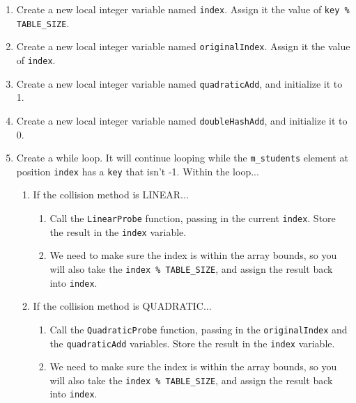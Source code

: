 \documentclass[a4paper,12pt,oneside]{book}
\begin{document}
\begin{enumerate}
    \item   Create a new local integer variable named \texttt{index}.
        Assign it the value of \texttt{key \% TABLE\_SIZE}.
    \item   Create a new local integer variable named \texttt{originalIndex}.
        Assign it the value of \texttt{index}.

    \item   Create a new local integer variable named \texttt{quadraticAdd},
        and initialize it to 1.
    \item   Create a new local integer variable named \texttt{doubleHashAdd},
        and initialize it to 0.

    \item   Create a while loop. It will continue looping while the
        \texttt{m\_students} element at position \texttt{index} has a
        \texttt{key} that isn't -1. Within the loop...
    \begin{enumerate}
        \item   If the collision method is LINEAR...
            \begin{enumerate}
                \item   Call the \texttt{LinearProbe} function,
                    passing in the current \texttt{index}. Store the
                    result in the \texttt{index} variable.
                \item   We need to make sure the index is within the array
                    bounds, so you will also take the \texttt{index \% TABLE\_SIZE},
                    and assign the result back into \texttt{index}.
            \end{enumerate}
            
        \item   If the collision method is QUADRATIC...
            \begin{enumerate}
                \item   Call the \texttt{QuadraticProbe} function,
                    passing in the \texttt{originalIndex} and the
                    \texttt{quadraticAdd} variables. Store the result in the
                    \texttt{index} variable.
                \item   We need to make sure the index is within the array
                    bounds, so you will also take the \texttt{index \% TABLE\_SIZE},
                    and assign the result back into \texttt{index}.
            \end{enumerate}
            

\end{enumerate}
\end{enumerate}
\end{document}
